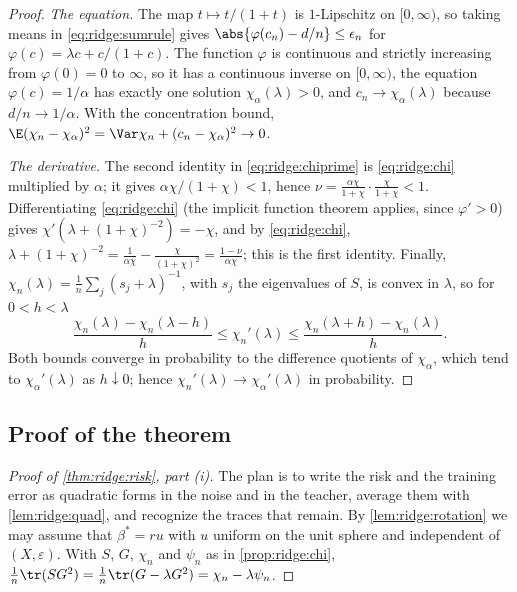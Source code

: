 \begin{refsection}
\begin{proof}
\emph{The equation.} The map $t\mapsto t/(1+t)$ is $1$-Lipschitz on $[0,\infty)$, so taking means in \eqref{eq:ridge:sumrule} gives $\abs{\varphi(c_n)-d/n}\le\epsilon_n$ for $\varphi(c)=\lambda c+c/(1+c)$. The function $\varphi$ is continuous and strictly increasing from $\varphi(0)=0$ to $\infty$, so it has a continuous inverse on $[0,\infty)$, the equation $\varphi(c)=1/\alpha$ has exactly one solution $\chi_\alpha(\lambda)>0$, and $c_n\to\chi_\alpha(\lambda)$ because $d/n\to1/\alpha$. With the concentration bound, $\E(\chi_n-\chi_\alpha)^2=\Var\chi_n+(c_n-\chi_\alpha)^2\to0$.

\emph{The derivative.} The second identity in \eqref{eq:ridge:chiprime} is \eqref{eq:ridge:chi} multiplied by $\alpha$; it gives $\alpha\chi/(1+\chi)<1$, hence $\nu=\frac{\alpha\chi}{1+\chi}\cdot\frac\chi{1+\chi}<1$. Differentiating \eqref{eq:ridge:chi} (the implicit function theorem applies, since $\varphi'>0$) gives $\chi'(\lambda+(1+\chi)^{-2})=-\chi$, and by \eqref{eq:ridge:chi}, $\lambda+(1+\chi)^{-2}=\frac1{\alpha\chi}-\frac\chi{(1+\chi)^2}=\frac{1-\nu}{\alpha\chi}$; this is the first identity. Finally, $\chi_n(\lambda)=\frac1n\sum_j(s_j+\lambda)^{-1}$, with $s_j$ the eigenvalues of $S$, is convex in $\lambda$, so for $0<h<\lambda$
\[
\frac{\chi_n(\lambda)-\chi_n(\lambda-h)}h\le\chi_n'(\lambda)\le\frac{\chi_n(\lambda+h)-\chi_n(\lambda)}h.
\]
Both bounds converge in probability to the difference quotients of $\chi_\alpha$, which tend to $\chi_\alpha'(\lambda)$ as $h\downarrow0$; hence $\chi_n'(\lambda)\to\chi_\alpha'(\lambda)$ in probability.
\end{proof}

\subsection{Proof of the theorem}

\begin{proof}[Proof of \cref{thm:ridge:risk}, part (i)]
The plan is to write the risk and the training error as quadratic forms in the noise and in the teacher, average them with \cref{lem:ridge:quad}, and recognize the traces that remain. By \cref{lem:ridge:rotation} we may assume that $\beta^*=ru$ with $u$ uniform on the unit sphere and independent of $(X,\varepsilon)$. With $S$, $G$, $\chi_n$ and $\psi_n$ as in \cref{prop:ridge:chi}, $\frac1n\tr(SG^2)=\frac1n\tr(G-\lambda G^2)=\chi_n-\lambda\psi_n$.


\end{proof}
\end{refsection}
